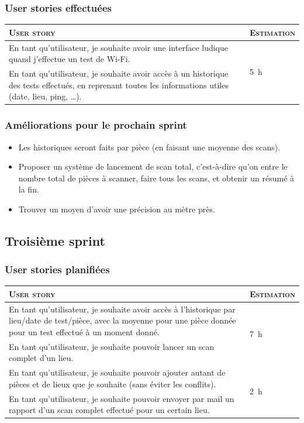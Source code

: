 \documentclass{elsarticle}
\newcommand{\est}[1]{\multirow{2}{*}{\SI{#1}{\hour}}}
\newcommand{\estbis}[1]{\SI{#1}{\hour}}
\begin{document}
\subsubsection{User stories effectuées}
\begin{table}[H]
	\centering
	\begin{tabular}{p{14cm}m{2cm}}
		\toprule
		\textsc{User story} & \textsc{Estimation}\\
		\midrule
		En tant qu'utilisateur, je souhaite avoir une interface ludique quand j'effectue un test de Wi-Fi. & \est{5}\\
		\midrule
		En tant qu'utilisateur, je souhaite avoir accès à un historique des tests effectués, en reprenant toutes les informations utiles (date, lieu, ping, \ldots). & \est{7}\\
		\bottomrule
	\end{tabular}
\end{table}

\subsubsection{Améliorations pour le prochain sprint}
\begin{itemize}
	\item Les historiques seront faits par pièce (en faisant une moyenne des scans).
	\item Proposer un système de lancement de scan total,
	c’est-à-dire qu’on entre le nombre total de pièces à scanner, faire tous les scans, et obtenir un résumé à la fin.
	\item Trouver un moyen d'avoir une précision au mètre près.
\end{itemize}

\subsection{Troisième sprint}
\subsubsection{User stories planifiées}
\begin{table}[H]
	\centering
	\begin{tabular}{p{14cm}m{2cm}}
		\toprule
		\textsc{User story} & \textsc{Estimation}\\
		\midrule
		En tant qu'utilisateur, je souhaite avoir accès à l'historique par lieu/date de test/pièce, avec la moyenne pour une pièce donnée pour un test effectué à un moment donné. & \est{7}\\
		\midrule
		En tant qu'utilisateur, je souhaite pouvoir lancer un scan complet d'un lieu. & \estbis{5}\\
		\midrule
		En tant qu'utilisateur, je souhaite pouvoir ajouter autant de pièces et de lieux que je souhaite (sans éviter les conflits). & \est{2}\\
		\midrule
		En tant qu'utilisateur, je souhaite pouvoir envoyer par mail un rapport d'un scan complet effectué pour un certain lieu. & \est{8}\\
		\bottomrule
	\end{tabular}
\end{table}
\end{document}
